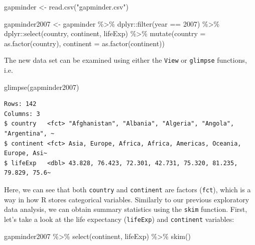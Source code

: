 \documentclass[
  letterpaper,
  DIV=11,
  numbers=noendperiod]{scrartcl}
\newenvironment{Shaded}{\begin{snugshade}}{\end{snugshade}}
\newcommand{\AttributeTok}[1]{\textcolor[rgb]{0.40,0.45,0.13}{#1}}
\newcommand{\DecValTok}[1]{\textcolor[rgb]{0.68,0.00,0.00}{#1}}
\newcommand{\FunctionTok}[1]{\textcolor[rgb]{0.28,0.35,0.67}{#1}}
\newcommand{\NormalTok}[1]{\textcolor[rgb]{0.00,0.23,0.31}{#1}}
\newcommand{\OtherTok}[1]{\textcolor[rgb]{0.00,0.23,0.31}{#1}}
\newcommand{\SpecialCharTok}[1]{\textcolor[rgb]{0.37,0.37,0.37}{#1}}
\newcommand{\StringTok}[1]{\textcolor[rgb]{0.13,0.47,0.30}{#1}}
\begin{document}
\begin{Shaded}
\begin{Highlighting}[]
\NormalTok{gapminder }\OtherTok{\textless{}{-}} \FunctionTok{read.csv}\NormalTok{(}\StringTok{"gapminder.csv"}\NormalTok{)}

\NormalTok{gapminder2007 }\OtherTok{\textless{}{-}}\NormalTok{ gapminder }\SpecialCharTok{\%\textgreater{}\%}
\NormalTok{  dplyr}\SpecialCharTok{::}\FunctionTok{filter}\NormalTok{(year }\SpecialCharTok{==} \DecValTok{2007}\NormalTok{) }\SpecialCharTok{\%\textgreater{}\%} 
\NormalTok{  dplyr}\SpecialCharTok{::}\FunctionTok{select}\NormalTok{(country, continent, lifeExp) }\SpecialCharTok{\%\textgreater{}\%}
  \FunctionTok{mutate}\NormalTok{(}\AttributeTok{country  =} \FunctionTok{as.factor}\NormalTok{(country),}
         \AttributeTok{continent =} \FunctionTok{as.factor}\NormalTok{(continent))}
\end{Highlighting}
\end{Shaded}

The new data set can be examined using either the \texttt{View} or
\texttt{glimpse} functions, i.e.

\begin{Shaded}
\begin{Highlighting}[]
\FunctionTok{glimpse}\NormalTok{(gapminder2007)}
\end{Highlighting}
\end{Shaded}

\begin{verbatim}
Rows: 142
Columns: 3
$ country   <fct> "Afghanistan", "Albania", "Algeria", "Angola", "Argentina", ~
$ continent <fct> Asia, Europe, Africa, Africa, Americas, Oceania, Europe, Asi~
$ lifeExp   <dbl> 43.828, 76.423, 72.301, 42.731, 75.320, 81.235, 79.829, 75.6~
\end{verbatim}

Here, we can see that both \texttt{country} and \texttt{continent} are
factors (\texttt{fct}), which is a way in how R stores categorical
variables. Similarly to our previous exploratory data analysis, we can
obtain summary statistics using the \texttt{skim} function. First, let's
take a look at the life expectancy (\texttt{lifeExp}) and
\texttt{continent} variables:

\begin{Shaded}
\begin{Highlighting}[]
\NormalTok{gapminder2007 }\SpecialCharTok{\%\textgreater{}\%} 
  \FunctionTok{select}\NormalTok{(continent, lifeExp) }\SpecialCharTok{\%\textgreater{}\%} 
  \FunctionTok{skim}\NormalTok{()}
\end{Highlighting}
\end{Shaded}
\end{document}
